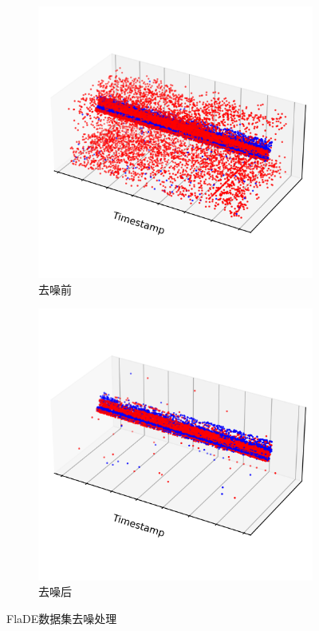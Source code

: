 \begin{figure}[ht]
    \centering
    \begin{subfigure}{0.49\textwidth}
        \centering
        \includegraphics[width=\textwidth,trim=0 30 0 50,clip]{figures/dataset_denoising_01.png}
        \caption{去噪前}
    \end{subfigure}
    \hfill
    \begin{subfigure}{0.49\textwidth}
        \centering
        \includegraphics[width=\textwidth,trim=0 30 0 50,clip]{figures/dataset_denoising_02.png}
        \caption{去噪后}
    \end{subfigure}
    \caption{FlaDE数据集去噪处理}
    \label{subfig:FlaDE_denoising}
\end{figure}

